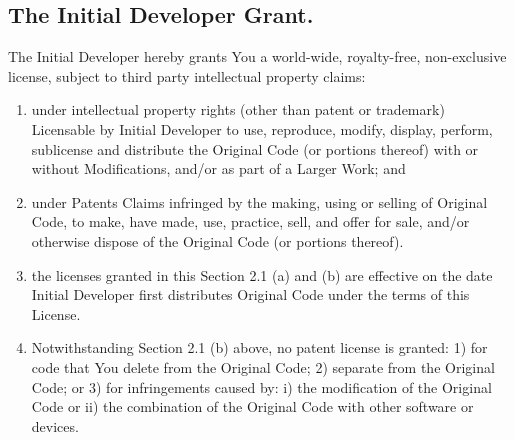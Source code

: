 \documentclass[letterpaper,colorlinks=true,linkcolor=blue]{book}
\begin{document}
\subsection{The Initial Developer Grant.}
The Initial Developer hereby grants You a world-wide, royalty-free, non-exclusive license, subject to third party intellectual property claims: 
\renewcommand{\theenumi}{\alph{enumi}}
\begin{enumerate}
\item under intellectual property rights (other than patent or trademark) Licensable by Initial Developer to use, reproduce, modify, display, perform, sublicense and distribute the Original Code (or portions thereof) with or without Modifications, and/or as part of a Larger Work; and 

\item under Patents Claims infringed by the making, using or selling of Original Code, to make, have made, use, practice, sell, and offer for sale, and/or otherwise dispose of the Original Code (or portions thereof). 

\item the licenses granted in this Section 2.1 (a) and (b) are effective on the date Initial Developer first distributes Original Code under the terms of this License. 

\item Notwithstanding Section 2.1 (b) above, no patent license is granted: 1) for code that You delete from the Original Code; 2) separate from the Original Code; or 3) for infringements caused by: i) the modification of the Original Code or ii) the combination of the Original Code with other software or devices. 
\end{enumerate}
\end{document}
